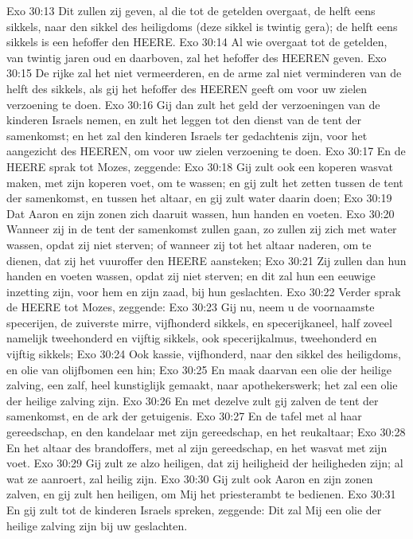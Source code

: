 Exo 30:13  Dit zullen zij geven, al die tot de getelden overgaat, de helft eens sikkels, naar den sikkel des heiligdoms (deze sikkel is twintig gera); de helft eens sikkels is een hefoffer den HEERE.
Exo 30:14  Al wie overgaat tot de getelden, van twintig jaren oud en daarboven, zal het hefoffer des HEEREN geven.
Exo 30:15  De rijke zal het niet vermeerderen, en de arme zal niet verminderen van de helft des sikkels, als gij het hefoffer des HEEREN geeft om voor uw zielen verzoening te doen.
Exo 30:16  Gij dan zult het geld der verzoeningen van de kinderen Israels nemen, en zult het leggen tot den dienst van de tent der samenkomst; en het zal den kinderen Israels ter gedachtenis zijn, voor het aangezicht des HEEREN, om voor uw zielen verzoening te doen.
Exo 30:17  En de HEERE sprak tot Mozes, zeggende:
Exo 30:18  Gij zult ook een koperen wasvat maken, met zijn koperen voet, om te wassen; en gij zult het zetten tussen de tent der samenkomst, en tussen het altaar, en gij zult water daarin doen;
Exo 30:19  Dat Aaron en zijn zonen zich daaruit wassen, hun handen en voeten.
Exo 30:20  Wanneer zij in de tent der samenkomst zullen gaan, zo zullen zij zich met water wassen, opdat zij niet sterven; of wanneer zij tot het altaar naderen, om te dienen, dat zij het vuuroffer den HEERE aansteken;
Exo 30:21  Zij zullen dan hun handen en voeten wassen, opdat zij niet sterven; en dit zal hun een eeuwige inzetting zijn, voor hem en zijn zaad, bij hun geslachten.
Exo 30:22  Verder sprak de HEERE tot Mozes, zeggende:
Exo 30:23  Gij nu, neem u de voornaamste specerijen, de zuiverste mirre, vijfhonderd sikkels, en specerijkaneel, half zoveel namelijk tweehonderd en vijftig sikkels, ook specerijkalmus, tweehonderd en vijftig sikkels;
Exo 30:24  Ook kassie, vijfhonderd, naar den sikkel des heiligdoms, en olie van olijfbomen een hin;
Exo 30:25  En maak daarvan een olie der heilige zalving, een zalf, heel kunstiglijk gemaakt, naar apothekerswerk; het zal een olie der heilige zalving zijn.
Exo 30:26  En met dezelve zult gij zalven de tent der samenkomst, en de ark der getuigenis.
Exo 30:27  En de tafel met al haar gereedschap, en den kandelaar met zijn gereedschap, en het reukaltaar;
Exo 30:28  En het altaar des brandoffers, met al zijn gereedschap, en het wasvat met zijn voet.
Exo 30:29  Gij zult ze alzo heiligen, dat zij heiligheid der heiligheden zijn; al wat ze aanroert, zal heilig zijn.
Exo 30:30  Gij zult ook Aaron en zijn zonen zalven, en gij zult hen heiligen, om Mij het priesterambt te bedienen.
Exo 30:31  En gij zult tot de kinderen Israels spreken, zeggende: Dit zal Mij een olie der heilige zalving zijn bij uw geslachten.
